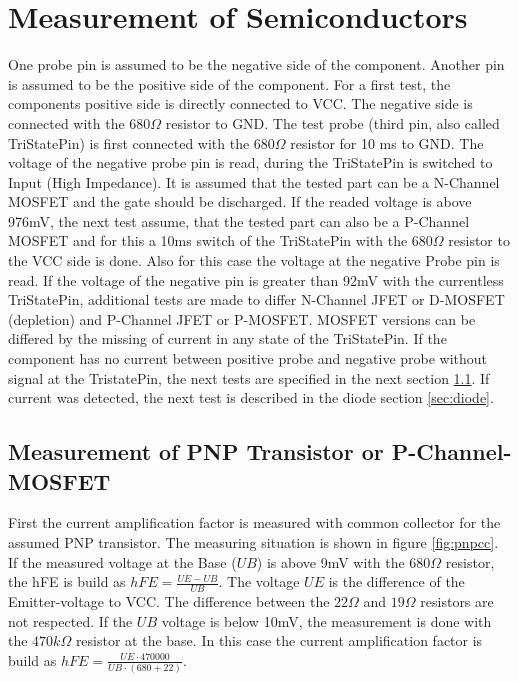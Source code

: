\section{Measurement of Semiconductors}
One probe pin is assumed to be the negative side of the component.
Another pin is assumed to be the positive side of the component.
For a first test, the components positive side is directly connected to VCC.
The negative side is connected with the \(680\Omega\) resistor to GND.
The test probe (third pin, also called TriStatePin) is first connected with the \(680\Omega\) resistor
for 10 ms to GND. The voltage of the negative probe pin is read, during  the TriStatePin is
switched to Input (High Impedance). It is assumed that the tested part can be
a N-Channel MOSFET and the gate should be discharged.
If the readed voltage is above 976mV, the next test assume, that the tested part can
also be a P-Channel MOSFET and for this a 10ms switch of the TriStatePin with the \(680\Omega\) resistor
to the VCC side is done.
Also for this case the voltage at the negative Probe pin is read.
If the voltage of the negative pin is greater than 92mV with the
currentless TriStatePin, additional tests are made to differ N-Channel JFET or D-MOSFET (depletion)
and P-Channel JFET or P-MOSFET. MOSFET versions can be differed by the missing of current in any state
of the TriStatePin.
If the component has no current between positive probe and negative probe without signal at the
TristatePin, the next tests are specified in the next section \ref{sec:pnp}.
If current was detected, the next test is described in the diode section \ref{sec:diode}.

\subsection{Measurement of PNP Transistor or P-Channel-MOSFET}
\label{sec:pnp}
First the current amplification factor is measured with common collector for the assumed PNP transistor.
The measuring situation is shown in figure \ref{fig:pnpcc}.
If the measured voltage at the Base (\(UB\)) is above 9mV with the \(680\Omega\) resistor,
the hFE is build as \(hFE = \frac{UE-UB}{UB}\). The voltage \(UE\) is the difference of the Emitter-voltage to VCC.
The difference between the \(22\Omega\) and \(19\Omega\) resistors are not respected.
If the \(UB\) voltage is below 10mV, the measurement is done with the \(470k\Omega\) resistor at the base.
In this case the current amplification factor is build as \(hFE = \frac{UE \cdot 470000}{UB \cdot (680+22)}\).

